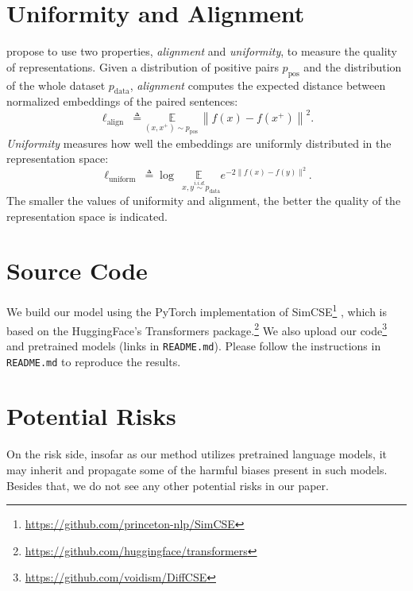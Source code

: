 \documentclass[11pt]{article}
\newcommand\mr[1]{\mathrm{#1}}
\begin{document}
\section{Uniformity and Alignment}
\label{sec:uni_align}

\citet{wang2020understanding} propose to use two properties, \emph{alignment} and \emph{uniformity}, to measure the quality of representations.
Given a distribution of positive pairs $p_{\mr{pos}}$ and the distribution of the whole dataset $p_{\mr{data}}$, \emph{alignment} computes the expected distance between normalized embeddings of the paired sentences:
\begin{equation*}
\ell_{\text {align }} \triangleq \underset{\left(x, x^{+}\right) \sim p_{\text {pos }}}{\mathbb{E}}\left\|f(x)-f\left(x^{+}\right)\right\|^{2}.
\end{equation*}
\emph{Uniformity} measures how well the embeddings are uniformly distributed in the representation space:
\begin{equation*}
    \ell_{\text {uniform }} \triangleq \log \underset{~~~x, y\stackrel{i.i.d.}{\sim}p_{\mathrm{data}}}{\mathbb{E}} e^{-2\|f(x)-f(y)\|^{2}}.
\end{equation*}
The smaller the values of uniformity and alignment, the better the quality of the representation space is indicated.
\section{Source Code}
\label{sec:code}

We build our model using the PyTorch implementation of SimCSE\footnote{\url{https://github.com/princeton-nlp/SimCSE}} \citet{gao2021simcse}, which is based on the HuggingFace's Transformers package.\footnote{\url{https://github.com/huggingface/transformers}} We also upload our code\footnote{\url{https://github.com/voidism/DiffCSE}} and pretrained models (links in \texttt{README.md}). Please follow the instructions in \texttt{README.md} to reproduce the results.

\section{Potential Risks}
\label{sec:risk}

On the risk side, insofar as our method utilizes pretrained language models, it may inherit and propagate some of the harmful biases present in such models. Besides that, we do not see any other potential risks in our paper.
\end{document}
